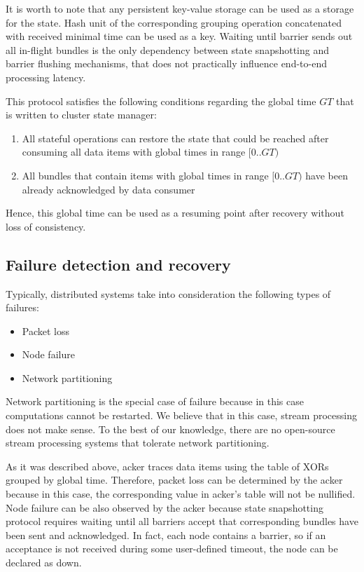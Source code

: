 It is worth to note that any persistent key-value storage can be used as a storage for the state. Hash unit of the corresponding grouping operation concatenated with received minimal time can be used as a key. Waiting until barrier sends out all in-flight bundles is the only dependency between state snapshotting and barrier flushing mechanisms, that does not practically influence end-to-end processing latency. 

This protocol satisfies the following conditions regarding the global time $GT$ that is written to cluster state manager:
\begin{enumerate}
    \item All stateful operations can restore the state that could be reached after consuming all data items with global times in range $[0..GT)$ 
    \item All bundles that contain items with global times in range $[0..GT)$ have been already acknowledged by data consumer 
\end{enumerate}

Hence, this global time can be used as a resuming point after recovery without loss of consistency.

\subsection{Failure detection and recovery}
Typically, distributed systems take into consideration the following types of failures:
\begin{itemize}
    \item Packet loss
    \item Node failure
    \item Network partitioning
\end{itemize}

Network partitioning is the special case of failure because in this case computations cannot be restarted. We believe that in this case, stream processing does not make sense. To the best of our knowledge, there are no open-source stream processing systems that tolerate network partitioning.

As it was described above, acker traces data items using the table of XORs grouped by global time. Therefore, packet loss can be determined by the acker because in this case, the corresponding value in acker's table will not be nullified. Node failure can be also observed by the acker because state snapshotting protocol requires waiting until all barriers accept that corresponding bundles have been sent and acknowledged. In fact, each node contains a barrier, so if an acceptance is not received during some user-defined timeout, the node can be declared as down. 

